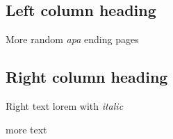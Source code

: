 \begin{pages}
\begin{Leftside}
\beginnumbering
\pstart
\section*{Left column heading}

More random \emph{apa}
ending pages

\pend
\endnumbering
\end{Leftside}
\begin{Rightside}
\ledsectnotoc
\beginnumbering
\pstart
\section*{Right column heading}

Right text lorem with \emph{italic}

\pend
\endnumbering
\end{Rightside}
\end{pages}
\Pages
more text

